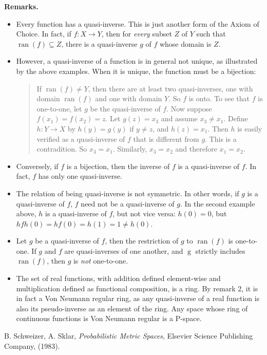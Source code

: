 \documentclass[12pt]{article}
\begin{document}
\textbf{Remarks.}
\begin{itemize}
\item Every function has a quasi-inverse.  This is just another form of the Axiom of Choice.  In fact, if $f:X\to Y$, then for \emph{every} subset $Z$ of $Y$ such that $\operatorname{ran}(f)\subseteq Z$, there is a quasi-inverse $g$ of $f$ whose domain is $Z$.
\item However, a quasi-inverse of a function is in general not unique, as illustrated by the above examples.  When it is unique, the function must be a bijection:
\begin{quote}
If $\operatorname{ran}(f)\ne Y$, then there are at least two quasi-inverses, one with domain $\operatorname{ran}(f)$ and one with domain $Y$.  So $f$ is onto.  To see that $f$ is one-to-one, let $g$ be the quasi-inverse of $f$.  Now suppose $f(x_1)=f(x_2)=z$.  Let $g(z)=x_3$ and assume $x_3\ne x_1$.  Define $h:Y\to X$ by $h(y)=g(y)$ if $y\ne z$, and $h(z)=x_1$.  Then $h$ is easily verified as a quasi-inverse of $f$ that is different from $g$.  This is a contradition.  So $x_3=x_1$.  Similarly, $x_3=x_2$ and therefore $x_1=x_2$.
\end{quote}
\item Conversely, if $f$ is a bijection, then the inverse of $f$ is a quasi-inverse of $f$.  In fact, $f$ has only one quasi-inverse.
\item The relation of being quasi-inverse is not symmetric.  In other words, if $g$ is a quasi-inverse of $f$, $f$ need not be a quasi-inverse of $g$.  In the second example above, $h$ is a quasi-inverse of $f$, but not vice versa: $h(0)=0$, but $hfh(0)=hf(0)=h(1)=1\ne h(0)$.
\item Let $g$ be a quasi-inverse of $f$, then the restriction of $g$ to $\operatorname{ran}(f)$ is one-to-one.  If $g$ and $f$ are quasi-inverses of one another, and $\operatorname{g}$ strictly includes $\operatorname{ran}(f)$, then $g$ is \emph{not} one-to-one.
\item The set of real functions, with addition defined element-wise and multiplication defined as functional composition, is a ring.  By remark 2, it is in fact a Von Neumann regular ring, as any quasi-inverse of a real function is also its pseudo-inverse as an element of the ring.  Any space whose ring of continuous functions is Von Neumann regular is a P-space.
\end{itemize}

\begin{thebibliography}{9}
 B. Schweizer, A. Sklar, \emph{Probabilistic Metric Spaces}, Elsevier Science Publishing Company, (1983).
\end{thebibliography}
\end{document}
